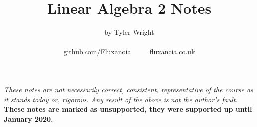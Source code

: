 \documentclass[a4paper, 12pt, twoside]{article}
\begin{document}
\title{Linear Algebra 2 Notes}
\date{}
\author{by Tyler Wright \\
  \\
  github.com/Fluxanoia $\qquad$ fluxanoia.co.uk
}
\maketitle

\vfill

\textit{These notes are not necessarily correct,
consistent, representative of the course as it stands today or, 
rigorous. Any result of the above is not the author's fault.}
\\[\baselineskip]
\textbf{These notes are marked as unsupported, they were supported
up until January 2020.}

\addtocounter{section}{-1}



\newpage

\tableofcontents













\end{document}
